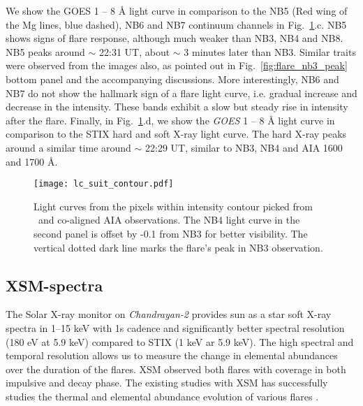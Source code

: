 We show the GOES 1 {--} 8 {\AA} light curve in comparison to the NB5 (Red wing of the Mg lines, blue dashed), NB6 and NB7 continuum channels in Fig.~\ref{fig:flare_lc_suit}.c. NB5 shows signs of flare response, although much weaker than NB3, NB4 and NB8. NB5 peaks around $\sim$ 22:31 UT, about $\sim$ 3 minutes later than NB3. Similar traits were observed from the images also, as pointed out in Fig.~\ref{fig:flare_nb3_peak} bottom panel and the accompanying discussions. More interestingly, NB6 and NB7 do not show the hallmark sign of a flare light curve, i.e. gradual increase and decrease in the intensity. These bands exhibit a slow but steady rise in intensity after the flare. Finally, in Fig.~\ref{fig:flare_lc_suit}.d, we show the {\it GOES} 1 {--} 8 {\AA} light curve in comparison to the STIX hard and soft X-ray light curve. The hard X-ray peaks around a similar time around $\sim$ 22:29 UT, similar to NB3, NB4 and AIA 1600 and 1700 {\AA}.

\begin{figure}[ht!]
    \centering
    \texttt{[image: lc\_suit\_contour.pdf]}
    \caption{Light curves from the pixels within intensity contour picked from \suit~and co-aligned AIA observations. The NB4 light curve in the second panel is offset by -0.1 from NB3 for better visibility. The vertical dotted dark line marks the flare's peak in NB3 observation.}
    \label{fig:flare_lc_suit}
\end{figure}

\subsection{XSM-spectra}\label{sec:xsm}

The Solar X-ray monitor on {\it Chandrayan-2}\citep[{\it Chandrayan-2}/XSM,][]{xsm} provides sun as a star soft X-ray spectra in 1{--}15 keV with 1s cadence and significantly better spectral resolution (180 eV at 5.9 keV) compared to STIX (1 keV ar 5.9 keV). The high spectral and temporal resolution allows us to measure the change in elemental abundances over the duration of the flares. XSM observed both flares with coverage in both impulsive and decay phase. The existing studies with XSM has successfully studies the thermal and elemental abundance evolution of various flares \citep{mondal21,kkepa23,nama23}.

